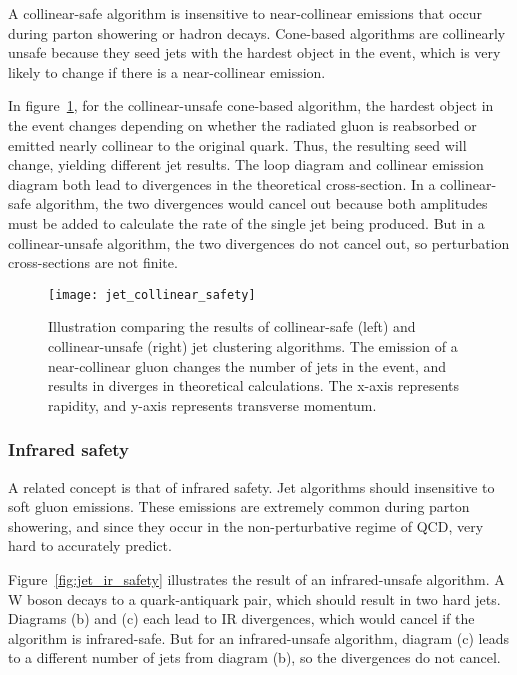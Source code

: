 A collinear-safe algorithm is insensitive to near-collinear emissions that occur during parton showering or hadron decays.
Cone-based algorithms are collinearly unsafe because they seed jets with the hardest object in the event,
which is very likely to change if there is a near-collinear emission.

In figure~\ref{fig:jet_collinear_safety}, for the collinear-unsafe cone-based algorithm,
the hardest object in the event changes depending on whether the radiated gluon is reabsorbed or emitted nearly collinear to the original quark.
Thus, the resulting seed will change, yielding different jet results.
The loop diagram and collinear emission diagram both lead to divergences in the theoretical cross-section.
In a collinear-safe algorithm, the two divergences would cancel out because both amplitudes must be added to calculate the rate
of the single jet being produced.
But in a collinear-unsafe algorithm, the two divergences do not cancel out, so perturbation cross-sections are not finite.

\begin{figure}[h!]
    \centering
\texttt{[image: jet\_collinear\_safety]}
\caption{Illustration comparing the results of collinear-safe (left) and collinear-unsafe (right) jet clustering algorithms.
The emission of a near-collinear gluon changes the number of jets in the event, and results in diverges in theoretical calculations.
The x-axis represents rapidity, and y-axis represents transverse momentum.}
\label{fig:jet_collinear_safety}
\end{figure}\cite{jet-jetography}

\subsubsection{Infrared safety}

A related concept is that of infrared safety.
Jet algorithms should insensitive to soft gluon emissions.
These emissions are extremely common during parton showering, and since they occur in the non-perturbative regime of QCD,
very hard to accurately predict.

Figure~\ref{fig:jet_ir_safety} illustrates the result of an infrared-unsafe algorithm.
A W boson decays to a quark-antiquark pair, which should result in two hard jets.
Diagrams (b) and (c) each lead to IR divergences, which would cancel if the algorithm is infrared-safe.
But for an infrared-unsafe algorithm, diagram (c) leads to a different number of jets from diagram (b),
so the divergences do not cancel.

